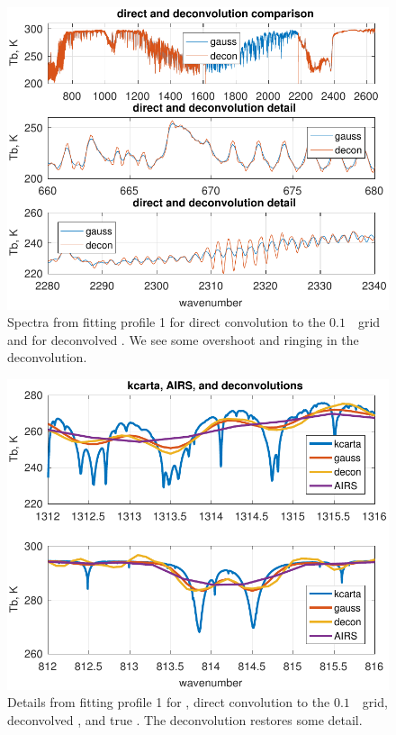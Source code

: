 \documentclass[10pt,twocolumn]{article}
\begin{document}
\begin{figure} %
  \centering
  \includegraphics[width=\linewidth]{figures/airs_decon_spec.pdf}
  \caption{Spectra from fitting profile 1 for direct convolution to
    the $0.1$~\wn\ grid and for deconvolved {\airs}.  We see some
    overshoot and ringing in the deconvolution.}
  \label{dspec}
\end{figure}

\begin{figure} %
  \centering
  \includegraphics[width=\linewidth]{figures/airs_decon_zoom.pdf}
  \caption{Details from fitting profile 1 for {\kcarta}, direct
    convolution to the $0.1$~\wn\ grid, deconvolved {\airs}, and
    true {\airs}.  The deconvolution restores some detail.}
  \label{dzoom}
\end{figure}
\end{document}
